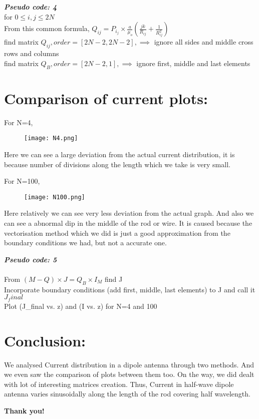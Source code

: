 \documentclass[12pt]{article}
\begin{document}
\\\\
\textbf{\textit{Pseudo code: 4}}\\
for $0 \le i,j \le 2N$\\
From this common formula, $Q_{ij}=P_i_j \times \frac{a}{\mu_{o}} ( \frac{jk}{R_{ij}} +\frac{1}{R_{ij}^2})$\\
find matrix $Q_{ij}, order=[2N-2,2N-2],\implies$ ignore all sides and middle cross rows and columns \\ 
find matrix $Q_{B}, order=[2N-2,1], \implies$ ignore first, middle and last elements\\

\restoregeometry

\newpage
\section*{Comparison of current plots:}

For N=4,
\begin{figure}[h!]
\centering
\texttt{[image: N4.png]}
\label{fig:exemplo}
\end{figure}

Here we can see a large deviation from the actual current distribution, it is because number of divisions along the length which we take is very small.

For N=100,
\begin{figure}[h!]
\centering
\texttt{[image: N100.png]}
\label{fig:exemplo}
\end{figure}

Here relatively we can see very less deviation from the actual graph. And also we can see a abnormal dip in the middle of the rod or wire. It is caused because the vectorisation method which we did is just a good approximation from the boundary conditions we had, but not a accurate one. 

\newpage
\textbf{\textit{Pseudo code: 5}}\\\\
From $(M - Q) \times J = Q_{B} \times I_{M}$ find J\\
Incorporate boundary conditions (add first, middle, last elements) to J and call it $J_final$\\
Plot (J\_final vs. z) and (I vs. z) for N=4 and 100


\section*{\textbf{Conclusion:}}
We analysed Current distribution in  a dipole antenna through two methods. And we even saw the comparison of plots between them too. On the way, we did dealt with lot of interesting matrices creation. Thus, Current in  half-wave dipole antenna varies sinusoidally along the length of the rod covering half wavelength.

\begin{center} 
\textbf{Thank you!}
\end{center} 
\end{document}
